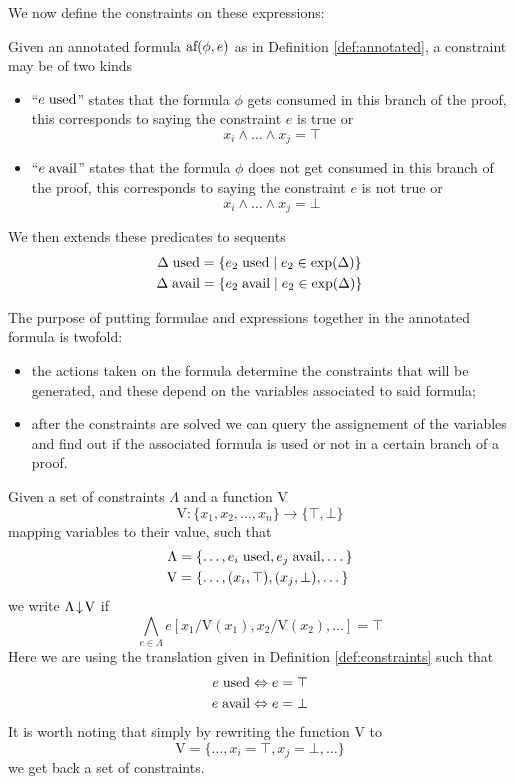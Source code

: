 \documentclass[a4paper, 12pt, tesi, english]{report}
\begin{document}
We now define the constraints on these expressions:
\begin{define}[Constraints]
	\label{def:constraints}
	Given an annotated formula $\text{af}(\phi, e)$ as in Definition \ref{def:annotated}, a constraint may be of two kinds
	\begin{itemize}
		\item ``$e \; \text{used}$'' states that the formula $\phi$ gets consumed in this branch of the proof, this corresponds to saying the constraint $e$ is true or
			$$ x_i \wedge \dots \wedge x_j = \top $$
		\item ``$e \; \text{avail}$'' states that the formula $\phi$ does not get consumed in this branch of the proof, this corresponds to saying the constraint $e$ is not true or
			$$ x_i \wedge \dots \wedge x_j = \bot $$
	\end{itemize}
	We then extends these predicates to sequents
	\begin{align*}
		\Delta \; \text{used} &= \{ e_2 \; \text{used} \mid e_2 \in \text{exp}(\Delta) \} \\
		\Delta \; \text{avail} &= \{ e_2 \; \text{avail} \mid e_2 \in \text{exp}(\Delta) \}
	\end{align*}
\end{define}
The purpose of putting formulae and expressions together in the annotated formula is twofold:
\begin{itemize}
	\item the actions taken on the formula determine the constraints that will be generated, and these depend on the variables associated to said formula;
	\item after the constraints are solved we can query the assignement of the variables and find out if the associated formula is used or not in a certain branch of a proof.
\end{itemize}

\begin{define}
	\label{def:sat}
	Given a set of constraints $\Lambda$ and a function V
	$$ \text{V} : \{ x_1, x_2, \dots, x_n \} \rightarrow \{ \top, \bot \} $$
	mapping variables to their value, such that
	\begin{align*}
		\Lambda &= \{ \dots, e_i \; \text{used}, e_j \; \text{avail}, \dots \} \\
		\text{V}&= \{ \dots, (x_i, \top), (x_j, \bot), \dots \}
	\end{align*}
	we write $\Lambda\!\downarrow\!\text{V}$ if 
	$$ \bigwedge_{e \in \Lambda} e[x_1 / \text{V}(x_1), x_2 / \text{V}(x_2), \dots] = \top $$
	Here we are using the translation given in Definition \ref{def:constraints} such that
	\begin{align*}
		e \; \text{used} &\Leftrightarrow e = \top \\
		e \; \text{avail} &\Leftrightarrow e = \bot
	\end{align*}
	It is worth noting that simply by rewriting the function V to
	$$ \text{V} = \{ \dots, x_i = \top, x_j = \bot, \dots \} $$
	we get back a set of constraints.
\end{define}
\end{document}
